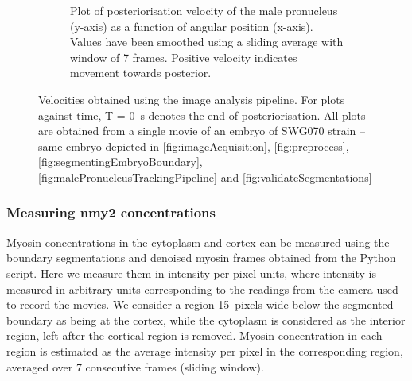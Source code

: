 \begin{figure}[h]
\begin{subfigure}[t]{0.45\textwidth}
    \caption{Plot of posteriorisation velocity of the male pronucleus (y-axis) as a function of angular position (x-axis). Values have been smoothed using a sliding average with window of \num{7} frames. Positive velocity indicates movement towards posterior.} 
    \label{subfig:malePronucleusTrackingVelocities-postVelVsAngleSmooth}
\end{subfigure}

\caption[Image analysis: Trajectory of male pronucleus (velocities)]{Velocities obtained using the image analysis pipeline. For plots against time, T = \SI{0}{\second} denotes the end of posteriorisation. All plots are obtained from a single movie of an embryo of SWG070 strain -- same embryo depicted in \autoref{fig:imageAcquisition}, \autoref{fig:preprocess}, \autoref{fig:segmentingEmbryoBoundary}, \autoref{fig:malePronucleusTrackingPipeline} and \autoref{fig:validateSegmentations}}
\label{fig:malePronucleusTrackingVelocities}
\end{figure}

\subsubsection{Measuring \ac{nmy2} concentrations}\label{subsubsec:myosinConc}
Myosin concentrations in the cytoplasm and cortex can be measured using the boundary segmentations and denoised myosin frames obtained from the Python script. Here we measure them in intensity per pixel units, where intensity is measured in arbitrary units corresponding to the readings from the camera used to record the movies. We consider a region \SI{15}{pixels} wide below the segmented boundary as being at the cortex, while the cytoplasm is considered as the interior region, left after the cortical region is removed. Myosin concentration in each region is estimated as the average intensity per pixel in the corresponding region, averaged over \num{7} consecutive frames (sliding window).

